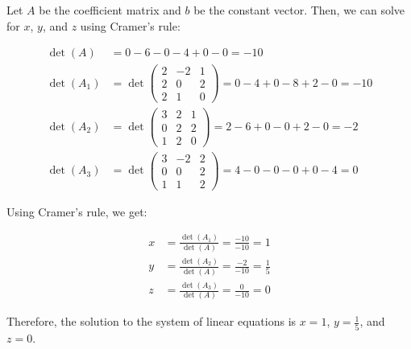 \documentclass{article}
\begin{document}
Let $A$ be the coefficient matrix and $b$ be the constant vector. Then, we can solve for $x$, $y$, and $z$ using Cramer's rule:

\begin{align*}
    \det(A)   & = 0 - 6 - 0 - 4 + 0 - 0 = -10                      \\
    \det(A_1) & = \det \begin{pmatrix}
                           2 & -2 & 1 \\
                           2 & 0  & 2 \\
                           2 & 1  & 0
                       \end{pmatrix} = 0 - 4 + 0 - 8 + 2 - 0 = -10 \\
    \det(A_2) & = \det \begin{pmatrix}
                           3 & 2 & 1 \\
                           0 & 2 & 2 \\
                           1 & 2 & 0
                       \end{pmatrix} = 2 - 6 + 0 - 0 + 2 - 0 = -2  \\
    \det(A_3) & = \det \begin{pmatrix}
                           3 & -2 & 2 \\
                           0 & 0  & 2 \\
                           1 & 1  & 2
                       \end{pmatrix} = 4 - 0 - 0 - 0 + 0 - 4 = 0
\end{align*}

Using Cramer's rule, we get:

\begin{align*}
    x & = \frac{\det(A_1)}{\det(A)} = \frac{-10}{-10} = 1          \\
    y & = \frac{\det(A_2)}{\det(A)} = \frac{-2}{-10} = \frac{1}{5} \\
    z & = \frac{\det(A_3)}{\det(A)} = \frac{0}{-10} = 0
\end{align*}

Therefore, the solution to the system of linear equations is $x = 1$, $y = \frac{1}{5}$, and $z = 0$.
\end{document}
